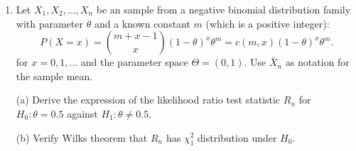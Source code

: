 \begin{enumerate}
\item
Let $X_1, X_2, \ldots, X_n$ be an \iid sample from a
negative binomial distribution family with parameter $\theta$ and a known
constant $m$ (which is a positive integer):
\[
P(X = x) = { m+x-1 \choose x} (1-\theta)^x \theta^m = c(m, x) (1-\theta)^x \theta^m.
\]
for $x=0, 1, \ldots$ and the parameter space $\Theta = (0, 1)$.
Use $\bar{X}_n$ as notation for the sample mean.


(a) Derive the expression of the likelihood ratio test statistic $R_n$ for 
$H_0: \theta = 0.5$ against $H_1: \theta \neq 0.5$.

(b) Verify Wilks theorem that $R_n$ has $\chi_1^2$ distribution
under $H_0$.

\end{enumerate}


